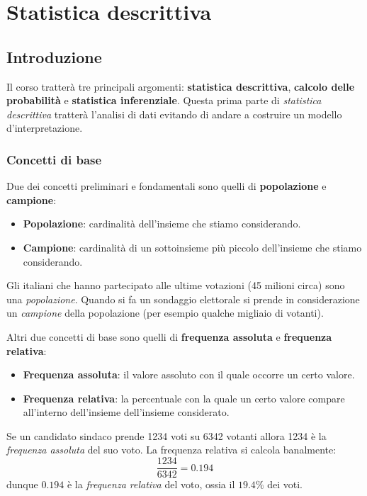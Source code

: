\part{Statistica descrittiva}
\chapter{Introduzione}
Il corso tratterà tre principali argomenti: \textbf{statistica descrittiva},
\textbf{calcolo delle probabilità} e \textbf{statistica inferenziale}. Questa prima parte di
\emph{statistica descrittiva} tratterà l'analisi di dati evitando di andare a costruire un modello
d'interpretazione.

\section{Concetti di base}
Due dei concetti preliminari e fondamentali sono quelli di \textbf{popolazione} e
\textbf{campione}:
\begin{itemize}
	\item \textbf{Popolazione}: cardinalità dell'insieme che stiamo considerando.
	\item \textbf{Campione}: cardinalità di un sottoinsieme più piccolo dell'insieme che stiamo
	      considerando.
\end{itemize}

\begin{example}
	Gli italiani che hanno partecipato alle ultime votazioni (45 milioni circa) sono una
	\emph{popolazione}. Quando si fa un sondaggio elettorale si prende in considerazione un
	\emph{campione} della popolazione (per esempio qualche migliaio di votanti).
\end{example}

Altri due concetti di base sono quelli di \textbf{frequenza assoluta} e
\textbf{frequenza relativa}:
\begin{itemize}
	\item \textbf{Frequenza assoluta}: il valore assoluto con il quale occorre un certo valore.
	\item \textbf{Frequenza relativa}: la percentuale con la quale un certo valore compare
	      all'interno dell'insieme dell'insieme considerato.
\end{itemize}

\begin{example}
	Se un candidato sindaco prende 1234 voti su 6342 votanti allora 1234 è la
	\emph{frequenza assoluta} del suo voto. La frequenza relativa si calcola banalmente:
	\[ \frac{1234}{6342} = 0.194 \]
	dunque $0.194$ è la \emph{frequenza relativa} del voto, ossia il $19.4 \%$ dei voti.
\end{example}

